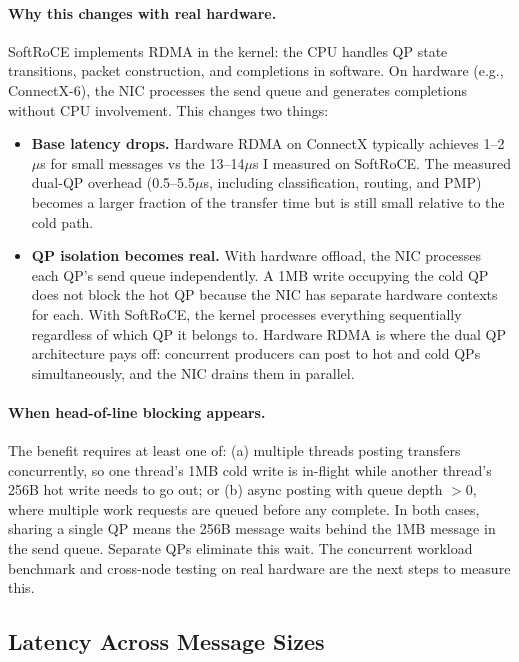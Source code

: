 \documentclass[11pt]{article}
\begin{document}
\paragraph{Why this changes with real hardware.} SoftRoCE implements RDMA in the kernel: the CPU handles QP state transitions, packet construction, and completions in software. On hardware (e.g., ConnectX-6), the NIC processes the send queue and generates completions without CPU involvement. This changes two things:

\begin{itemize}
\item \textbf{Base latency drops.} Hardware RDMA on ConnectX typically achieves 1--2$\mu$s for small messages vs the 13--14$\mu$s I measured on SoftRoCE. The measured dual-QP overhead (0.5--5.5$\mu$s, including classification, routing, and PMP) becomes a larger fraction of the transfer time but is still small relative to the cold path.
\item \textbf{QP isolation becomes real.} With hardware offload, the NIC processes each QP's send queue independently. A 1MB write occupying the cold QP does not block the hot QP because the NIC has separate hardware contexts for each. With SoftRoCE, the kernel processes everything sequentially regardless of which QP it belongs to. Hardware RDMA is where the dual QP architecture pays off: concurrent producers can post to hot and cold QPs simultaneously, and the NIC drains them in parallel.
\end{itemize}

\paragraph{When head-of-line blocking appears.} The benefit requires at least one of: (a) multiple threads posting transfers concurrently, so one thread's 1MB cold write is in-flight while another thread's 256B hot write needs to go out; or (b) async posting with queue depth $> 0$, where multiple work requests are queued before any complete. In both cases, sharing a single QP means the 256B message waits behind the 1MB message in the send queue. Separate QPs eliminate this wait. The concurrent workload benchmark and cross-node testing on real hardware are the next steps to measure this.

\subsection{Latency Across Message Sizes}
\end{document}
